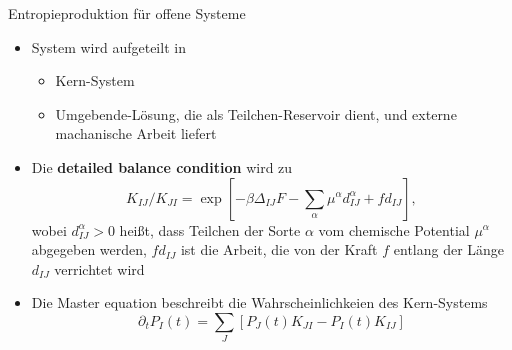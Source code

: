 \documentclass[aspectratio=1610, 9pt]{beamer}
\begin{document}
\begin{frame}{Entropieproduktion für offene Systeme}%
  \begin{itemize}
    \item System wird aufgeteilt in
    \begin{itemize}
      \item Kern-System
      \item Umgebende-Lösung, die als Teilchen-Reservoir dient, und externe machanische Arbeit liefert
    \end{itemize}
    \item Die \textbf{detailed balance condition} wird zu
    \begin{equation}
      K_{I J} / K_{ J I} = \exp[-\beta \Delta_{IJ}F - \sum_\alpha \mu^\alpha d_{IJ}^\alpha + f d_{IJ}],
  \end{equation}
  wobei $d_{IJ}^\alpha >0$ heißt, dass Teilchen der Sorte $\alpha$ vom chemische Potential $\mu^\alpha$ abgegeben werden,
  $f d_{IJ}$ ist die Arbeit, die von der Kraft $f$ entlang der Länge $d_{IJ}$ verrichtet wird 
  \item Die Master equation beschreibt die Wahrscheinlichkeien des Kern-Systems
  \begin{equation}
    \partial_t P_I(t) = \sum_J[ P_J(t)K_{J I}- P_I(t)K_{I J}]
  \end{equation}
\end{itemize}  
\end{frame}
\end{document}
